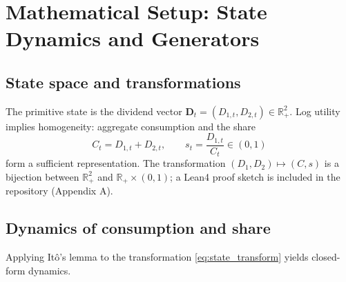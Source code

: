 ﻿\documentclass[11pt,letterpaper,oneside]{article}
\numberwithin{equation}{section}
\newcommand{\R}{\mathbb{R}}
\newcommand{\1}{\mathbf{1}}
\begin{document}
\section{Mathematical Setup: State Dynamics and Generators}
\subsection{State space and transformations}
The primitive state is the dividend vector $\bm{D}_t=(D_{1,t},D_{2,t})\in\R_+^2$. Log utility implies homogeneity: aggregate consumption and the share
\begin{equation}\label{eq:state_transform}
  C_t=D_{1,t}+D_{2,t}, \qquad s_t=\frac{D_{1,t}}{C_t}\in(0,1)
\end{equation}
form a sufficient representation. The transformation $(D_1,D_2)\mapsto(C,s)$ is a bijection between $\R_+^2$ and $\R_+\times(0,1)$; a Lean4 proof sketch is included in the repository (Appendix A).

\subsection{Dynamics of consumption and share}
Applying It\^o's lemma to the transformation \eqref{eq:state_transform} yields closed-form dynamics.
\end{document}
